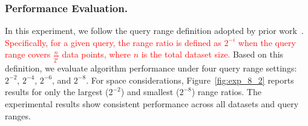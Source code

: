 \documentclass[sigconf, nonacm]{acmart}
\begin{document}
{	
	\subsubsection{Performance Evaluation. }
	
	In this experiment, we follow the query range definition adopted by prior work~\cite{HQI}. \textcolor{red}{Specifically, for a given query, the range ratio is defined as $2^{-i}$	when the query range covers $\frac{n}{2^i}$ data points, where $n$ is the total dataset size.}
	Based on this definition, we evaluate algorithm performance under four query range settings: $2^{-2}$, $2^{-4}$, $2^{-6}$, and $2^{-8}$. For space considerations, Figure~\ref{fig:exp_8_2} reports results for only the largest ($2^{-2}$) and smallest ($2^{-8}$) range ratios. The experimental results show consistent performance across all datasets and query ranges.
	
	
}
\end{document}
